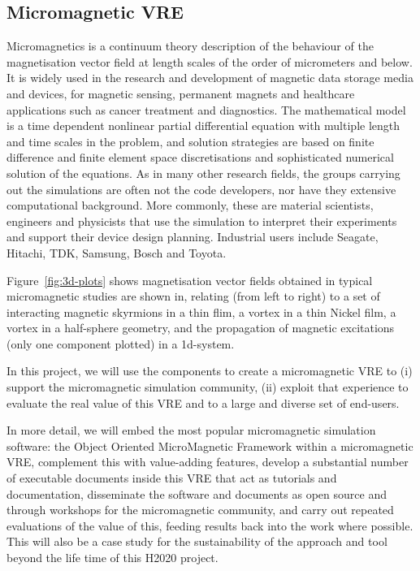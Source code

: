 \subsection{Micromagnetic VRE}
Micromagnetics is a continuum theory description of the behaviour of
the magnetisation vector field at length scales of the order of
micrometers and below. It is widely used in the research and
development of magnetic data storage media and devices, for magnetic
sensing, permanent magnets and healthcare applications such as cancer
treatment and diagnostics. The mathematical model is a time dependent
nonlinear partial differential equation with multiple length and time
scales in the problem, and solution strategies are based on finite
difference and finite element space discretisations and sophisticated
numerical solution of the equations. As in many other research fields,
the groups carrying out the simulations are often not the code
developers, nor have they extensive computational background. More
commonly, these are material scientists, engineers and physicists that
use the simulation to interpret their experiments and support their
device design planning. Industrial users include Seagate, Hitachi,
TDK, Samsung, Bosch and Toyota.

Figure~\ref{fig:3d-plots} shows magnetisation vector fields obtained
in typical micromagnetic studies are shown in, relating (from left to
right) to a set of interacting magnetic skyrmions in a thin flim, a
vortex in a thin Nickel film, a vortex in a half-sphere geometry, and
the propagation of magnetic excitations (only one component plotted)
in a 1d-system.

In this project, we will use the \TheProject components to create a
micromagnetic VRE to (i) support the micromagnetic simulation
community, (ii) exploit that experience to evaluate the real value of
this VRE and \TheProject to a large and diverse set of end-users.

In more detail, we will embed the most popular micromagnetic
simulation software: the Object Oriented MicroMagnetic Framework
\cite{OOMMF-url} within a micromagnetic VRE, complement this with
value-adding features, develop a substantial number of executable
documents inside this VRE that act as tutorials and documentation,
disseminate the software and documents as open source and through
workshops for the micromagnetic community, and carry out repeated
evaluations of the value of this, feeding results back into the
\TheProject work where possible. This will also be a case study for
the sustainability of the approach and tool beyond the life time of
this H2020 project.

